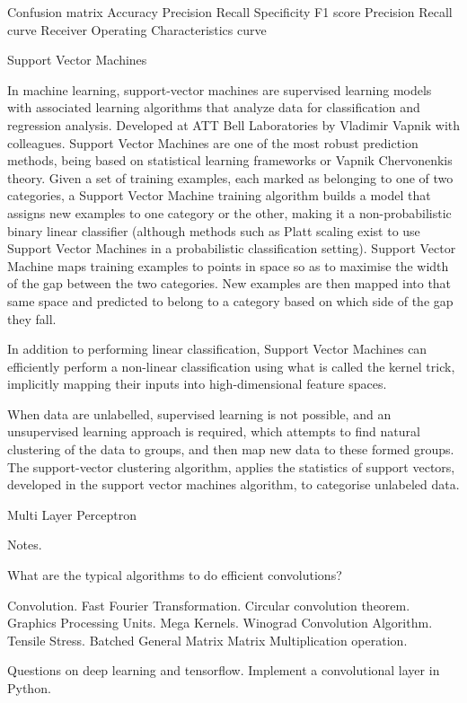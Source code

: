 Confusion matrix
Accuracy
Precision
Recall
Specificity
F1 score
Precision Recall curve
Receiver Operating Characteristics curve

Support Vector Machines

In machine learning, support-vector machines are supervised learning models with associated learning algorithms that analyze data for classification and regression analysis. Developed at ATT Bell Laboratories by Vladimir Vapnik with colleagues. Support Vector Machines are one of the most robust prediction methods, being based on statistical learning frameworks or Vapnik Chervonenkis theory. Given a set of training examples, each marked as belonging to one of two categories, a Support Vector Machine training algorithm builds a model that assigns new examples to one category or the other, making it a non-probabilistic binary linear classifier (although methods such as Platt scaling exist to use Support Vector Machines in a probabilistic classification setting). Support Vector Machine maps training examples to points in space so as to maximise the width of the gap between the two categories. New examples are then mapped into that same space and predicted to belong to a category based on which side of the gap they fall.

In addition to performing linear classification, Support Vector Machines can efficiently perform a non-linear classification using what is called the kernel trick, implicitly mapping their inputs into high-dimensional feature spaces.

When data are unlabelled, supervised learning is not possible, and an unsupervised learning approach is required, which attempts to find natural clustering of the data to groups, and then map new data to these formed groups. The support-vector clustering algorithm, applies the statistics of support vectors, developed in the support vector machines algorithm, to categorise unlabeled data.

Multi Layer Perceptron

Notes.

What are the typical algorithms to do efficient convolutions?

Convolution. Fast Fourier Transformation. Circular convolution theorem. Graphics Processing Units. Mega Kernels. Winograd Convolution Algorithm. Tensile Stress. Batched General Matrix Matrix Multiplication operation.

Questions on deep learning and tensorflow. Implement a convolutional layer in Python.


